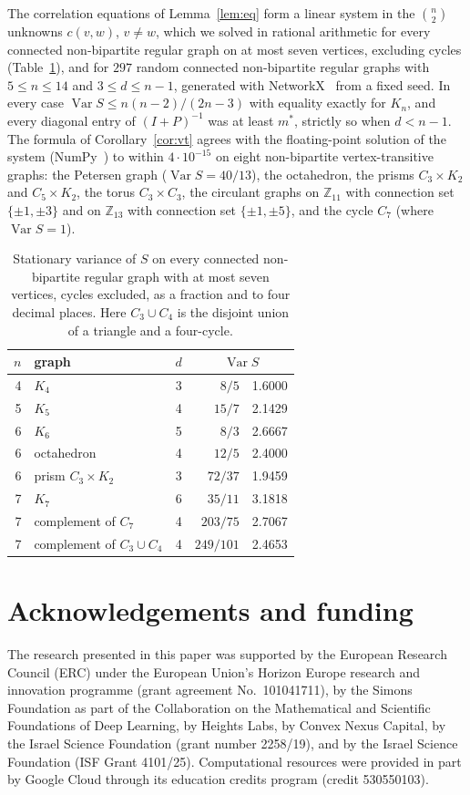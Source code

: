 \documentclass[11pt]{amsart}
\theoremstyle{remark}
\numberwithin{equation}{section}
\DeclareMathOperator{\Var}{Var}
\begin{document}
The correlation equations of Lemma~\ref{lem:eq} form a linear system in the $\binom n2$ unknowns $c(v,w)$, $v\ne w$,
which we solved in rational arithmetic for every connected non-bipartite regular graph on at most seven vertices, excluding cycles
(Table~\ref{tab:small}), and for $297$ random connected non-bipartite regular graphs with $5\le n\le14$ and $3\le d\le
n-1$, generated with NetworkX~\cite{HSS} from a fixed seed. In every case $\Var S\le n(n-2)/(2n-3)$ with equality exactly for $K_n$, and every diagonal entry of
$(I+P)^{-1}$ was at least $m^*$, strictly so when $d<n-1$. The formula of Corollary~\ref{cor:vt} agrees with the
floating-point solution of the system (NumPy~\cite{NumPy}) to within $4\cdot10^{-15}$ on eight non-bipartite vertex-transitive graphs: the Petersen graph
($\Var S=40/13$), the octahedron, the prisms $C_3\times K_2$ and $C_5\times K_2$, the torus $C_3\times C_3$, the
circulant graphs on $\mathbb{Z}_{11}$ with connection set $\{\pm1,\pm3\}$ and on $\mathbb{Z}_{13}$ with connection set
$\{\pm1,\pm5\}$, and the cycle $C_7$ (where $\Var S=1$).

\begin{table}[ht]
\centering
\begin{tabular}{rlrrr}
\toprule
$n$ & graph & $d$ & \multicolumn{2}{c}{$\Var S$}\\
\midrule
4 & $K_4$ & 3 & $8/5$ & 1.6000\\
5 & $K_5$ & 4 & $15/7$ & 2.1429\\
6 & $K_6$ & 5 & $8/3$ & 2.6667\\
6 & octahedron & 4 & $12/5$ & 2.4000\\
6 & prism $C_3\times K_2$ & 3 & $72/37$ & 1.9459\\
7 & $K_7$ & 6 & $35/11$ & 3.1818\\
7 & complement of $C_7$ & 4 & $203/75$ & 2.7067\\
7 & complement of $C_3\cup C_4$ & 4 & $249/101$ & 2.4653\\
\bottomrule
\end{tabular}
\caption{Stationary variance of $S$ on every connected non-bipartite regular graph with at most seven vertices,
cycles excluded, as a fraction and to four decimal places. Here $C_3\cup C_4$ is the disjoint union of a triangle and
a four-cycle.}\label{tab:small}
\end{table}

\section*{Acknowledgements and funding}
The research presented in this paper was supported by the European Research
Council (ERC) under the European Union's Horizon Europe research and
innovation programme (grant agreement No.~101041711), by the Simons
Foundation as part of the Collaboration on the Mathematical and Scientific
Foundations of Deep Learning, by Heights Labs, by Convex Nexus Capital, by
the Israel Science Foundation (grant number 2258/19), and by the Israel
Science Foundation (ISF Grant 4101/25). Computational resources were
provided in part by Google Cloud through its education credits program
(credit 530550103).
\end{document}
